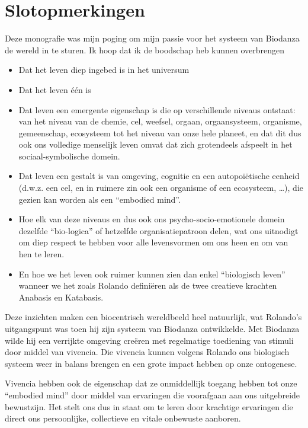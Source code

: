 \documentclass[
  11pt,
]{book}
\begin{document}
\chapter{Slotopmerkingen}\label{slotopmerkingen}

Deze monografie was mijn poging om mijn passie voor het systeem van Biodanza de wereld in te sturen. Ik hoop dat ik de boodschap heb kunnen overbrengen

\begin{itemize}
\item
  Dat het leven diep ingebed is in het universum
\item
  Dat het leven één is
\item
  Dat leven een emergente eigenschap is die op verschillende niveaus ontstaat: van het niveau van de chemie, cel, weefsel, orgaan, orgaansysteem, organisme, gemeenschap, ecosysteem tot het niveau van onze hele planeet, en dat dit dus ook ons volledige menselijk leven omvat dat zich grotendeels afspeelt in het sociaal-symbolische domein.
\item
  Dat leven een gestalt is van omgeving, cognitie en een autopoiëtische eenheid (d.w.z. een cel, en in ruimere zin ook een organisme of een ecosysteem, \ldots), die gezien kan worden als een ``embodied mind''.
\item
  Hoe elk van deze niveaus en dus ook ons psycho-socio-emotionele domein dezelfde ``bio-logica'' of hetzelfde organisatiepatroon delen, wat ons uitnodigt om diep respect te hebben voor alle levensvormen om ons heen en om van hen te leren.
\item
  En hoe we het leven ook ruimer kunnen zien dan enkel ``biologisch leven'' wanneer we het zoals Rolando definiëren als de twee creatieve krachten Anabasis en Katabasis.
\end{itemize}

Deze inzichten maken een biocentrisch wereldbeeld heel natuurlijk, wat Rolando's uitgangspunt was toen hij zijn systeem van Biodanza ontwikkelde. Met Biodanza wilde hij een verrijkte omgeving creëren met regelmatige toediening van stimuli door middel van vivencia. Die vivencia kunnen volgens Rolando ons biologisch systeem weer in balans brengen en een grote impact hebben op onze ontogenese.

Vivencia hebben ook de eigenschap dat ze onmiddellijk toegang hebben tot onze ``embodied mind'' door middel van ervaringen die voorafgaan aan ons uitgebreide bewustzijn. Het stelt ons dus in staat om te leren door krachtige ervaringen die direct ons persoonlijke, collectieve en vitale onbewuste aanboren.
\end{document}
